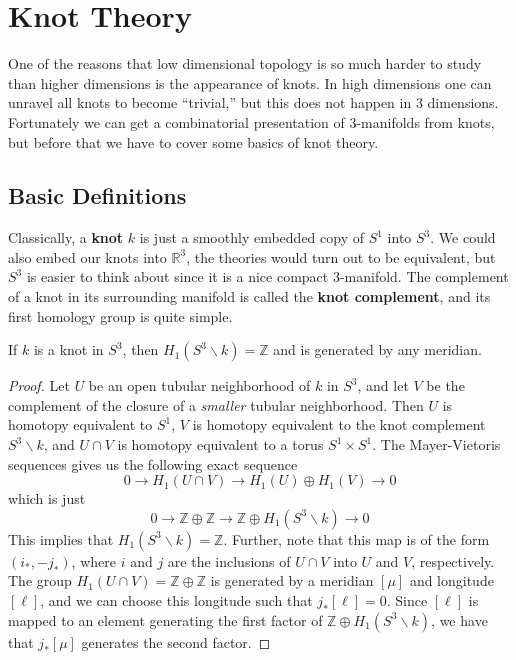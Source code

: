 \newpage
\section{Knot Theory}
\label{Knot Theory}


One of the reasons that low dimensional topology is so much harder to study than higher dimensions is the appearance of knots. In high dimensions one can unravel all knots to become ``trivial,'' but this does not happen in 3 dimensions. Fortunately we can get a combinatorial presentation of 3-manifolds from knots, but before that we have to cover some basics of knot theory.


\subsection{Basic Definitions}
\label{Basic Definitions}


Classically, a \textbf{knot} $k$ is just a smoothly embedded copy of $S^1$ into $S^3$. We could also embed our knots into $\mathbb R^3$, the theories would turn out to be equivalent, but $S^3$ is easier to think about since it is a nice compact 3-manifold. The complement of a knot in its surrounding manifold is called the \textbf{knot complement}, and its first homology group is quite simple.

\begin{prop}
\label{homology of knot complement in sphere}
If $k$ is a knot in $S^3$, then $H_1(S^3 \backslash k) = \mathbb Z$ and is generated by any meridian.
\end{prop}
\begin{proof}
Let $U$ be an open tubular neighborhood of $k$ in $S^3$, and let $V$ be the complement of the closure of a \emph{smaller} tubular neighborhood. Then $U$ is homotopy equivalent to $S^1$, $V$ is homotopy equivalent to the knot complement $S^3 \backslash k$, and $U \cap V$ is homotopy equivalent to a torus $S^1 \times S^1$. The Mayer-Vietoris sequences gives us the following exact sequence
\[ 0 \longrightarrow H_1(U \cap V) \stackrel{}{\longrightarrow} H_1(U) \oplus H_1(V) \stackrel{}{\longrightarrow} 0 \]
which is just
\[ 0 \longrightarrow \mathbb Z \oplus \mathbb Z \longrightarrow \mathbb Z \oplus H_1(S^3 \backslash k) \longrightarrow 0 \]
This implies that $H_1(S^3 \backslash k) = \mathbb Z$. Further, note that this map is of the form $(i_*,-j_*)$, where $i$ and $j$ are the inclusions of $U \cap V$ into $U$ and $V$, respectively. The group $H_1(U \cap V) = \mathbb Z \oplus \mathbb Z$ is generated by a meridian $[\mu]$ and longitude $[\ell]$, and we can choose this longitude such that $j_*[\ell]=0$. Since $[\ell]$ is mapped to an element generating the first factor of $\mathbb Z \oplus H_1(S^3 \backslash k)$, we have that $j_*[\mu]$ generates the second factor.
\end{proof}


